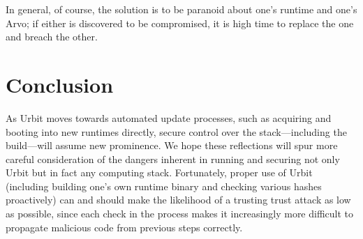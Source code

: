 \documentclass[twoside]{article}
\begin{document}
In general, of course, the solution is to be paranoid about one's runtime and one's Arvo; if either is discovered to be compromised, it is high time to replace the one and breach the other.

\section{Conclusion}

As Urbit moves towards automated update processes, such as acquiring and booting into new runtimes directly, secure control over the stack—including the build—will assume new prominence.  We hope these reflections will spur more careful consideration of the dangers inherent in running and securing not only Urbit but in fact any computing stack.  Fortunately, proper use of Urbit (including building one's own runtime binary and checking various hashes proactively) can and should make the likelihood of a trusting trust attack as low as possible, since each check in the process makes it increasingly more difficult to propagate malicious code from previous steps correctly.\tombstone{}

\printbibliography
\end{document}
